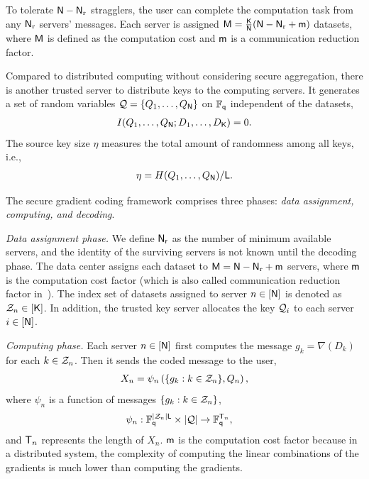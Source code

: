 \documentclass[conference,letterpaper]{IEEEtran}
\begin{document}
To tolerate ${\sf N} - {\sf N}_{\rm r}$ stragglers, the user can complete the computation task from any ${\sf N}_{\rm r}$ servers' messages. Each server is assigned ${\sf M} = \frac{{\sf K}}{{\sf N}} ({\sf N} - {\sf N}_{\rm r} + {\sf m} ) $ datasets, where ${\sf M}$ is defined as the computation cost and ${\sf m}$ is a communication reduction factor.

\fi
 Compared to distributed computing without considering secure aggregation, there is another trusted server to distribute keys to the computing servers. It generates a set of  random variables ${\cal Q} = \{Q_{1}, \ldots, Q_{{\sf N}}\}$ on $\mathbb{F}_{{\sf q}}$ independent of the datasets, %
\begin{align}
I(Q_1, \ldots, Q_{{\sf N}} ; D_1, \ldots, D_{{\sf K}} ) = 0. \label{eq:independent key}
\end{align}
The source key size \( \eta \) measures the total amount of randomness among all keys, i.e.,
\begin{align}
\eta = H( Q_1, \ldots, Q_{{\sf N}} )/{\sf L}. \label{eq:def of eta}
\end{align}


The secure gradient coding framework comprises three phases: {\it data assignment, computing, and decoding}. 

{\it Data assignment phase.}
 We define ${\sf N_r}$ as the number of minimum available servers, and the identity of the surviving servers is not known until the decoding phase. 
The data center assigns each dataset to ${\sf M} ={\sf N}-{\sf N}_{\rm r}+{\sf m}$ servers, where ${\sf m}$ is the computation cost factor (which is also called communication reduction factor in~\cite{ye2018communication}). The index set of datasets assigned to server $n \in [{\sf N}]$ is denoted as ${\cal Z}_n \in [{\sf K}]$.  In addition, the trusted key server allocates the key   ${\cal Q}_i$ to each server $i\in [{\sf N}]$.



{\it Computing phase.}
Each server $n \in[{\sf N}]$ first computes the message $g_k = \nabla (D_k)$ for each $k \in {\cal Z}_n$. Then it sends the coded message to the user, 
\begin{align}
 X_n = \psi_n \left( \{g_k:  k \in {\cal Z}_n\},  Q_n \right),
 \end{align}
  where  $\psi_n$  is a  function of messages $\{g_k: k\in {\cal Z}_n\}$, 
\begin{align} 
\psi_n &:  \mathbb{F}_{{\sf q}}^{ |{\cal Z}_n| {\sf L}} \times   | {\cal Q} |  \to \mathbb{F}_{{\sf q}}^{ {\sf T}_n },  
\label{eq: encoding function def}
\end{align}
and ${\sf T}_n$ represents the length of $ X_n $. %
${\sf m}$ is the computation cost factor because in a distributed system, the complexity of computing the linear combinations of the gradients is much lower than computing the gradients. %
\end{document}
